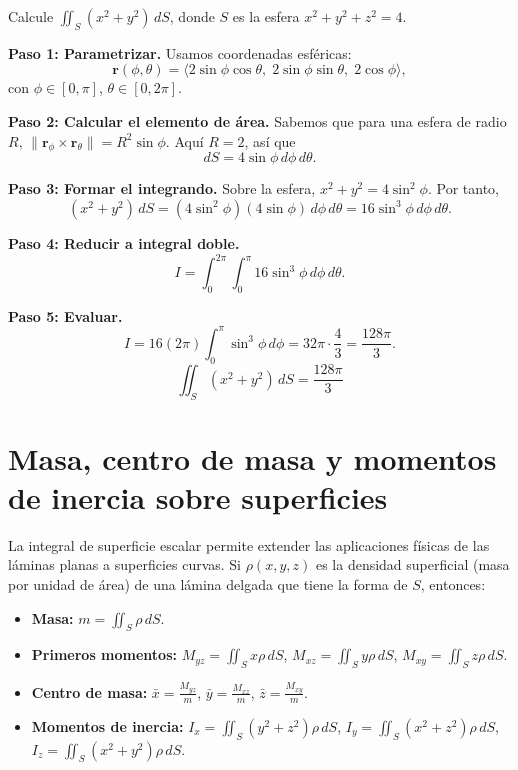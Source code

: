 \begin{example}
Calcule $\displaystyle \iint_S (x^2+y^2)\,dS$, donde $S$ es la esfera $x^2+y^2+z^2=4$.
\begin{myproof}
\textbf{Paso 1: Parametrizar.}
Usamos coordenadas esféricas:
\[
\mathbf{r}(\phi,\theta)=\langle 2\sin\phi\cos\theta,\; 2\sin\phi\sin\theta,\; 2\cos\phi \rangle,
\]
con $\phi\in[0,\pi]$, $\theta\in[0,2\pi]$.

\textbf{Paso 2: Calcular el elemento de área.}
Sabemos que para una esfera de radio $R$, $\|\mathbf{r}_\phi \times \mathbf{r}_\theta\| = R^2\sin\phi$. Aquí $R=2$, así que
\[
dS = 4\sin\phi\,d\phi\,d\theta.
\]

\textbf{Paso 3: Formar el integrando.}
Sobre la esfera, $x^2+y^2 = 4\sin^2\phi$. Por tanto,
\[
(x^2+y^2)\,dS = (4\sin^2\phi)(4\sin\phi)\,d\phi\,d\theta = 16\sin^3\phi\,d\phi\,d\theta.
\]

\textbf{Paso 4: Reducir a integral doble.}
\[
I = \int_0^{2\pi}\int_0^\pi 16\sin^3\phi\,d\phi\,d\theta.
\]

\textbf{Paso 5: Evaluar.}
\[
I = 16(2\pi)\int_0^\pi \sin^3\phi\,d\phi
= 32\pi \cdot \frac{4}{3}
= \frac{128\pi}{3}.
\]
\[
\boxed{\displaystyle \iint_S (x^2+y^2)\,dS = \frac{128\pi}{3}}
\]
\end{myproof}
\end{example}

\section{Masa, centro de masa y momentos de inercia sobre superficies}

La integral de superficie escalar permite extender las aplicaciones físicas de las láminas planas a superficies curvas. Si $\rho(x,y,z)$ es la densidad superficial (masa por unidad de área) de una lámina delgada que tiene la forma de $S$, entonces:

\begin{itemize}
\item \textbf{Masa:} $\displaystyle m = \iint_S \rho\,dS$.
\item \textbf{Primeros momentos:} 
  $\displaystyle M_{yz} = \iint_S x\rho\,dS$, 
  $\displaystyle M_{xz} = \iint_S y\rho\,dS$, 
  $\displaystyle M_{xy} = \iint_S z\rho\,dS$.
\item \textbf{Centro de masa:} 
  $\displaystyle \bar{x} = \frac{M_{yz}}{m}$, 
  $\displaystyle \bar{y} = \frac{M_{xz}}{m}$, 
  $\displaystyle \bar{z} = \frac{M_{xy}}{m}$.
\item \textbf{Momentos de inercia:} 
  $\displaystyle I_x = \iint_S (y^2+z^2)\rho\,dS$, 
  $\displaystyle I_y = \iint_S (x^2+z^2)\rho\,dS$, 
  $\displaystyle I_z = \iint_S (x^2+y^2)\rho\,dS$.
\end{itemize}

